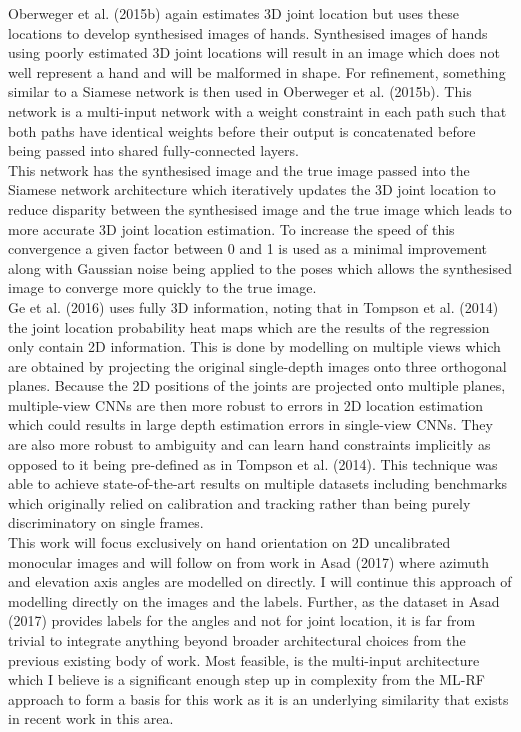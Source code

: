 \documentclass{article}
\begin{document}
Oberweger et al. (2015b) again estimates 3D joint location but uses these locations to develop synthesised images of hands. Synthesised images of hands using poorly estimated 3D joint locations will result in an image which does not well represent a hand and will be malformed in shape. For refinement, something similar to a Siamese network is then used in Oberweger et al. (2015b). This network is a multi-input network with a weight constraint in each path such that both paths have identical weights before their output is concatenated before being passed into shared fully-connected layers.\\

This network has the synthesised image and the true image passed into the Siamese network architecture which iteratively updates the 3D joint location to reduce disparity between the synthesised image and the true image which leads to more accurate 3D joint location estimation. To increase the speed of this convergence a given factor between 0 and 1 is used as a minimal improvement along with Gaussian noise being applied to the poses which allows the synthesised image to converge more quickly to the true image.\\

Ge et al. (2016) uses fully 3D information, noting that in Tompson et al. (2014) the joint location probability heat maps which are the results of the regression only contain 2D information. This is done by modelling on multiple views which are obtained by projecting the original single-depth images onto three orthogonal planes. Because the 2D positions of the joints are projected onto multiple planes, multiple-view CNNs are then more robust to errors in 2D location estimation which could results in large depth estimation errors in single-view CNNs. They are also more robust to ambiguity and can learn hand constraints implicitly as opposed to it being pre-defined as in Tompson et al. (2014). This technique was able to achieve state-of-the-art results on multiple datasets including benchmarks which originally relied on calibration and tracking rather than being purely discriminatory on single frames.\\

This work will focus exclusively on hand orientation on 2D uncalibrated monocular images and will follow on from work in Asad (2017) where azimuth and elevation axis angles are modelled on directly. I will continue this approach of modelling directly on the images and the labels. Further, as the dataset in Asad (2017) provides labels for the angles and not for joint location, it is far from trivial to integrate anything beyond broader architectural choices from the previous existing body of work. Most feasible, is the multi-input architecture which I believe is a significant enough step up in complexity from the ML-RF approach to form a basis for this work as it is an underlying similarity that exists in recent work in this area. \\
\end{document}
